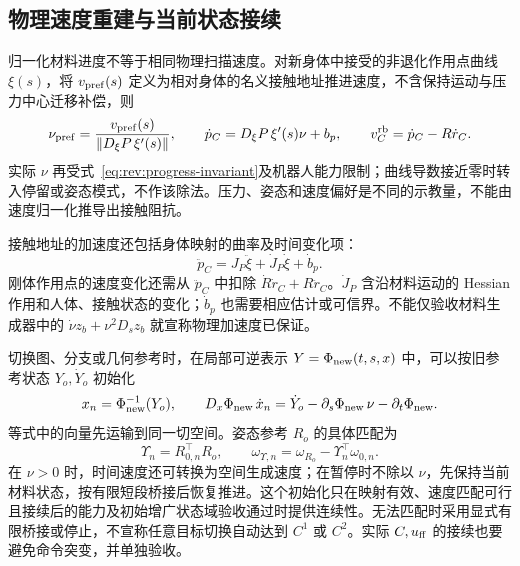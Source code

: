 \documentclass[11pt,a4paper]{article}
\numberwithin{equation}{section}
\theoremstyle{definition}
\begin{document}
\subsection{物理速度重建与当前状态接续}
归一化材料进度不等于相同物理扫描速度。对新身体中接受的非退化作用点曲线 $\xi(s)$，将 $v_{\rm pref}(s)$ 定义为相对身体的名义接触地址推进速度，不含保持运动与压力中心迁移补偿，则
\begin{equation}
 \nu_{\rm pref}=\frac{v_{\rm pref}(s)}{\|D_\xi P\,\xi'(s)\|},\qquad
 \dot p_C=D_\xi P\,\xi'(s)\nu+b_p,\qquad v_C^{\rm rb}=\dot p_C-R\dot r_C.
\end{equation}
实际 $\nu$ 再受式~\eqref{eq:rev:progress-invariant}及机器人能力限制；曲线导数接近零时转入停留或姿态模式，不作该除法。压力、姿态和速度偏好是不同的示教量，不能由速度归一化推导出接触阻抗。

接触地址的加速度还包括身体映射的曲率及时间变化项：
\begin{equation}
 \ddot p_C=J_P\ddot\xi+\dot J_P\dot\xi+\dot b_p.
\end{equation}
刚体作用点的速度变化还需从 $\ddot p_C$ 中扣除 $\dot R\dot r_C+R\ddot r_C$。$\dot J_P$ 含沿材料运动的 Hessian 作用和人体、接触状态的变化；$\dot b_p$ 也需要相应估计或可信界。不能仅验收材料生成器中的 $\dot\nu z_b+\nu^2D_sz_b$ 就宣称物理加速度已保证。

切换图、分支或几何参考时，在局部可逆表示 $Y=\Phi_{\rm new}(t,s,x)$ 中，可以按旧参考状态 $Y_o,\dot Y_o$ 初始化
\begin{equation}
 x_n=\Phi_{\rm new}^{-1}(Y_o),\qquad
 D_x\Phi_{\rm new}\,\dot x_n
 =\dot Y_o-\partial_s\Phi_{\rm new}\,\nu-\partial_t\Phi_{\rm new}.
\end{equation}
等式中的向量先运输到同一切空间。姿态参考 $R_o$ 的具体匹配为
\begin{equation}
 \Upsilon_n=R_{0,n}^\top R_o,\qquad
 \omega_{\Upsilon,n}=\omega_{R_o}-\Upsilon_n^\top\omega_{0,n}.
\end{equation}
在 $\nu>0$ 时，时间速度还可转换为空间生成速度；在暂停时不除以 $\nu$，先保持当前材料状态，按有限短段桥接后恢复推进。这个初始化只在映射有效、速度匹配可行且接续后的能力及初始增广状态域验收通过时提供连续性。无法匹配时采用显式有限桥接或停止，不宣称任意目标切换自动达到 $C^1$ 或 $C^2$。实际 $C,u_{\rm ff}$ 的接续也要避免命令突变，并单独验收。
\end{document}
